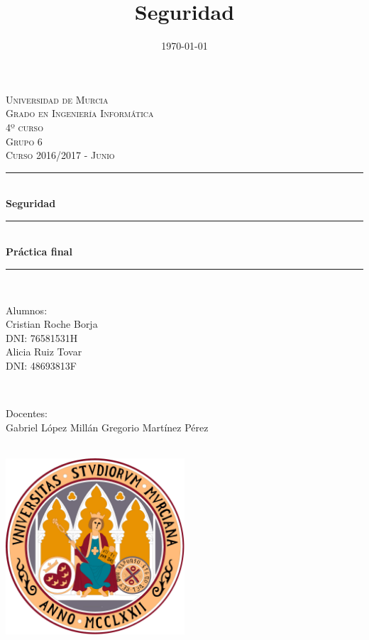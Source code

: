 \documentclass[a4,12pt,onecolum]{article}
\title{Seguridad}
\date{\today}
\begin{document}

\begin{titlepage}

\newcommand{\HRule}{\rule{\linewidth}{0.5mm}} %

\center %

\textsc{\LARGE Universidad de Murcia}\\[0.8cm]
\textsc{\Large Grado en Ingeniería Informática}\\[0.5cm]
\textsc{\large 4º curso}\\[0.4cm]
\textsc{\large Grupo 6}\\[0.4cm]
\textsc{\large Curso 2016/2017 - Junio}\\[0.4cm]

\HRule \\[0.6cm]
{ \huge \bfseries Seguridad}\\[0.3cm]
\HRule \\[0.5cm]
{ \Large \bfseries Práctica final}\\[0.3cm]
\HRule \\[1.0cm]


\begin{minipage}{0.4\textwidth}
\begin{flushleft} \large
Alumnos:\\
Cristian Roche Borja \\
\small{DNI: 76581531H}	\\
\large{Alicia Ruiz Tovar} \\
\small{DNI: 48693813F}
\end{flushleft}
\end{minipage}
~
\begin{minipage}{0.4\textwidth}
\begin{flushright} \large
Docentes: \\
Gabriel López Millán
Gregorio Martínez Pérez
\end{flushright}
\end{minipage}\\[1cm]


\centering
\includegraphics[width=0.5\textwidth]{./portada/logoum.png}\\[0.8cm] %

\end{titlepage}
\end{document}
